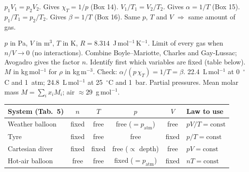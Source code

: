 \documentclass[10pt,a4paper]{article}
\begin{document}
  {$p_1V_1 = p_2V_2$. Gives $\chi_T = 1/p$ (Box 14).}
  {$V_1/T_1 = V_2/T_2$. Gives $\alpha = 1/T$ (Box 15).}
  {$p_1/T_1 = p_2/T_2$. Gives $\beta = 1/T$ (Box 16).}
  {Same $p$, $T$ and $V$ $\Rightarrow$ same amount of gas.}

  {$p$ in Pa, $V$ in m$^3$, $T$ in K, $R = 8.314$~J\,mol$^{-1}$\,K$^{-1}$. Limit of every gas
   when $n/V \to 0$ (no interactions).}
  {Combine Boyle--Mariotte, Charles and Gay-Lussac; Avogadro gives the factor $n$.}
  {Identify first which variables are fixed (table below).}
  {$M$ in kg\,mol$^{-1}$ for $\rho$ in kg\,m$^{-3}$.}
  {Check: $\alpha/(p\,\chi_T) = 1/T = \beta$.}
  {22.4~L\,mol$^{-1}$ at 0~$^\circ$C and 1~atm; 24.8~L\,mol$^{-1}$ at 25~$^\circ$C and 1~bar.}
  {Partial pressures. Mean molar mass $M = \sum_i x_i M_i$; air $\approx 29$~g\,mol$^{-1}$.}
\par\smallskip
\begin{center}
\small
\renewcommand{\arraystretch}{1.12}
\begin{tabular}{@{}lccccl@{}}
\toprule
System (Tab.~5) & $n$ & $T$ & $p$ & $V$ & Law to use\\
\midrule
Weather balloon & fixed & free & free ($= p_{\text{atm}}$) & free & $pV/T = \text{const}$\\
Tyre & fixed & free & free & fixed & $p/T = \text{const}$\\
Cartesian diver & fixed & fixed & free ($\propto$ depth) & free & $pV = \text{const}$\\
Hot-air balloon & free & free & fixed ($= p_{\text{atm}}$) & fixed & $nT = \text{const}$\\
\bottomrule
\end{tabular}
\end{center}
\end{document}
